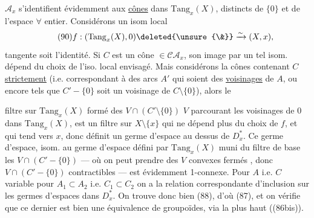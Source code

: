 $\mathcal A_x$ s'identifient évidemment aux \uline{cônes}
dans $\mathrm{Tang}_x(X)$, 
distincts de $\{0\}$ et de l'espace
 $\forall$ entier.
Considérons un isom local
\[
\tag{90}
f:(\mathrm{Tang}_x(X),0)\deleted{\unsure{\&}}
\xrightarrow{\sim}(X,x),
\]
 tangente soit l'identité.
 Si $C$ est un cône $\in\mathcal C\mathcal A_x$,
son image par un tel isom. dépend du choix de l'iso. local envisagé.
Mais considérons la 
 cônes
 contenant
\deleted{$\unsure{\in}$} $C$ \uline{strictement}
(i.e. correspondant à des arcs $A'$ qui soient des \uline{voisinages}
de $A$, ou encore tels que $C'-\{0\}$ soit un voisinage de
$C\setminus\{0\}$), alors le

filtre sur $\mathrm{Tang}_x(X)$ formé des
$V\cap(C'\setminus\{0\})$  $V$
parcourant les voisinages de $0$ dans $\mathrm{Tang}_x(X)$,
est un filtre sur $X\setminus\{x\}$ qui ne dépend plus du choix de $f$,
et qui tend vers $x$, donc définit un germe d'espace
au dessus de  $D_x^*$.
Ce germe d'espace, 
isom. au germe d'espace défini par $\mathrm{Tang}_x(X)$ muni du filtre
de base les $V\cap(C'-\{0\})$ --- où on peut prendre des $V$
convexes fermés , donc
$V\cap(C'-\{0\})$ contractibles --- est évidemment 1-connexe.
Pour $A$ i.e. $C$ variable  pour $A_1\subset A_2$
i.e. $C_1\subset C_2$ on a la relation correspondante d'inclusion
sur les germes d'espaces dans $D_x^*$.
On trouve donc bien (88), d'où (87), et on vérifie
que ce dernier est bien une équivalence de 
groupoïdes, via la 
  plus haut ((86bis)).

